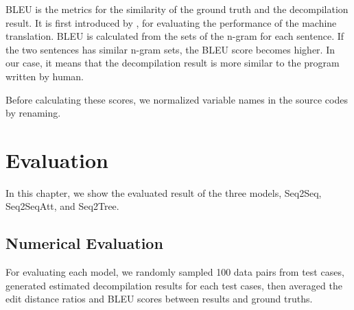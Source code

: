 \documentclass[senior,final,11pt]{iscs-thesis}
\begin{document}
BLEU is the metrics for the similarity of the ground truth and the decompilation result. 
It is first introduced by \citet{BLEU}, for evaluating the performance of the machine translation.
BLEU is calculated from the sets of the n-gram for each sentence. 
If the two sentences has similar n-gram sets, the BLEU score becomes higher.
In our case, it means that the decompilation result is more similar to the program written by human. %


Before calculating these scores, we normalized variable names in the source codes by renaming.

\chapter{Evaluation}
In this chapter, we show the evaluated result of the three models, Seq2Seq, Seq2SeqAtt, and Seq2Tree.








\section{Numerical Evaluation}
For evaluating each model, we randomly sampled 100 data pairs from test cases, generated estimated decompilation results for each test cases,
then averaged the edit distance ratios and BLEU scores between results and ground truths.
\end{document}
